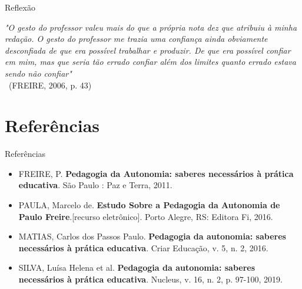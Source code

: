 \documentclass[12pt]{beamer}
\begin{document}
	\begin{frame}{Reflexão}
		\justifying
		
		\textit{"O gesto do professor valeu mais do que a própria
			nota dez que atribuiu à minha redação. O gesto do
			professor me trazia uma confiança ainda obviamente desconfiada de que era possível trabalhar e produzir. De que era possível confiar em mim, mas que seria tão errado confiar além dos
			limites quanto errado estava sendo não confiar"} \\ \ (FREIRE, 2006, p. 43)
	\end{frame}

\section{Referências}

\begin{frame}{Referências}
	
	\begin{itemize}
		\justifying
		\item FREIRE, P. \textbf{Pedagogia da Autonomia: saberes necessários à prática educativa}. São Paulo : Paz e Terra, 2011.
		
		\item PAULA, Marcelo de. \textbf{Estudo Sobre a Pedagogia da Autonomia de Paulo Freire}.[recurso eletrônico]. Porto Alegre, RS: Editora Fi, 2016. 
		
		\item MATIAS, Carlos dos Passos Paulo. \textbf{Pedagogia da autonomia: saberes necessários à prática educativa}. Criar Educação, v. 5, n. 2, 2016.
		
		\item SILVA, Luísa Helena et al. \textbf{Pedagogia da autonomia: saberes necessários à prática educativa}. Nucleus, v. 16, n. 2, p. 97-100, 2019.
		
	\end{itemize}
\end{frame}
\end{document}
